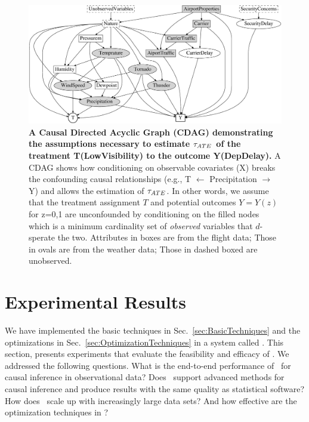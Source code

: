 

\begin{figure}
  \centering
    \includegraphics[width=.7\linewidth]{Figures/dag.eps}
\caption{ {\bf \small A Causal Directed Acyclic Graph (CDAG)  demonstrating
    the assumptions necessary to estimate ${\tau_{ATE}}$ of the treatment
    T(LowVisibility) to the outcome Y(DepDelay).}  A CDAG shows how conditioning on observable covariates (X)
breaks the confounding causal relationships (e.g., T  $\leftarrow$ Precipitation
$\rightarrow$ Y) and allows the estimation of ${\tau_{ATE}}$. In other words, we assume that the treatment assignment $T$
and potential outcomes $Y=Y(z)$ for z=0,1 are unconfounded
by conditioning on the filled nodes which is a minimum cardinality set of {\em observed} variables that $d$-sperate the two. Attributes in boxes are from the flight data; Those in ovals are from the weather data; Those in dashed boxed are unobserved.}
\label{fig:dag}
\end{figure}

\vspace{-0.6cm}
\section{Experimental Results}
\label{sec:exp}

We have implemented the basic techniques in
Sec.~\ref{sec:BasicTechniques} and the optimizations in
Sec.~\ref{sec:OptimizationTechniques} in a system called \GSQL.  This
section, presents experiments that evaluate the feasibility and
efficacy of \GSQL.  We addressed the following questions.  What is the
end-to-end performance of \GSQL \ for causal inference in
observational data?  Does \GSQL \ support advanced methods for causal
inference and produce results with the same quality as statistical
software? How does \GSQL\ scale up with increasingly large data sets?
And how effective are the optimization techniques in \GSQL?

